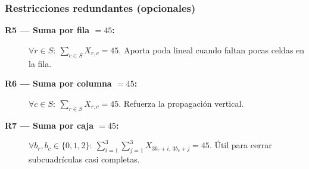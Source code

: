 \subsubsection*{Restricciones redundantes (opcionales)}
\begin{description}
  \item[\textbf{R5 — Suma por fila \(=45\):}] \(\forall r\in S:\ \sum_{c\in S}X_{r,c}=45\). Aporta poda lineal cuando faltan pocas celdas en la fila.
  \item[\textbf{R6 — Suma por columna \(=45\):}] \(\forall c\in S:\ \sum_{r\in S}X_{r,c}=45\). Refuerza la propagación vertical.
  \item[\textbf{R7 — Suma por caja \(=45\):}] \(\forall b_r,b_c\in\{0,1,2\}:\ \sum_{i=1}^{3}\sum_{j=1}^{3}X_{3b_r+i,\,3b_c+j}=45\). Útil para cerrar subcuadrículas casi completas.
\end{description}
